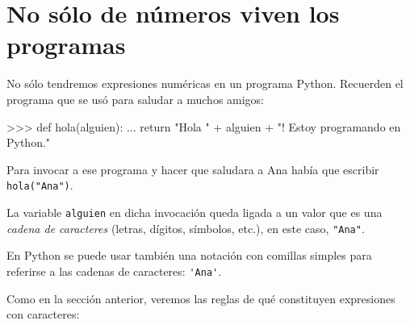 
\section{No sólo de números viven los programas} \label{nosolo}

No sólo tendremos expresiones numéricas en un programa Python.
Recuerden el programa que se usó para saludar a muchos amigos:

\begin{codigo-python-sn}
>>> def hola(alguien):
...     return "Hola " + alguien + "! Estoy programando en Python."
\end{codigo-python-sn}

Para invocar a ese programa y hacer que saludara a Ana había que
escribir \lstinline!hola("Ana")!.

La variable \lstinline!alguien! en dicha invocación queda ligada a un
valor que es una {\it cadena de caracteres} (letras, dígitos, símbolos,
etc.), en este caso, \lstinline!"Ana"!.

En Python se puede usar también una notación con comillas simples para
referirse a las cadenas de caracteres: \lstinline!'Ana'!.

Como en la sección anterior, veremos las reglas de qué constituyen
expresiones con caracteres:

